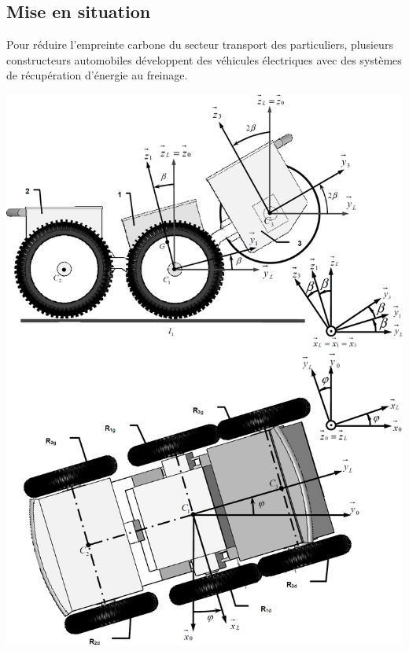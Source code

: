 \documentclass[10pt,fleqn]{article} %
\begin{document}

\vspace{4.5cm}
\pagestyle{fancy}
\thispagestyle{plain}


\def\columnseprulecolor{\color{ocre}}
\setlength{\columnseprule}{0.4pt} 

\ifprof
\else
\begin{multicols}{2}
\fi

\section*{Mise en situation}
\ifprof
\else
Pour réduire l’empreinte carbone du secteur transport des particuliers, plusieurs constructeurs automobiles
développent des véhicules électriques avec des systèmes de récupération d’énergie au freinage. %


\begin{center}
\includegraphics[width=\linewidth]{images/fig_01}
\end{center}


\end{multicols}
\end{document}
